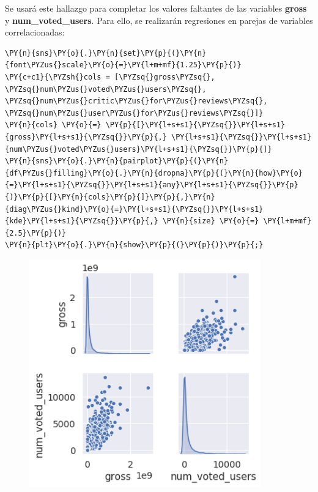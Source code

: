     Se usará este hallazgo para completar los valores faltantes de las
variables \textbf{gross} y \textbf{num\_voted\_users}. Para ello, se
realizarán regresiones en parejas de variables correlacionadas:

    \begin{tcolorbox}[breakable, size=fbox, boxrule=1pt, pad at break*=1mm,colback=cellbackground, colframe=cellborder]
\begin{Verbatim}[commandchars=\\\{\}]
\PY{n}{sns}\PY{o}{.}\PY{n}{set}\PY{p}{(}\PY{n}{font\PYZus{}scale}\PY{o}{=}\PY{l+m+mf}{1.25}\PY{p}{)}
\PY{c+c1}{\PYZsh{}cols = [\PYZsq{}gross\PYZsq{}, \PYZsq{}num\PYZus{}voted\PYZus{}users\PYZsq{}, \PYZsq{}num\PYZus{}critic\PYZus{}for\PYZus{}reviews\PYZsq{}, \PYZsq{}num\PYZus{}user\PYZus{}for\PYZus{}reviews\PYZsq{}]}
\PY{n}{cols} \PY{o}{=} \PY{p}{[}\PY{l+s+s1}{\PYZsq{}}\PY{l+s+s1}{gross}\PY{l+s+s1}{\PYZsq{}}\PY{p}{,} \PY{l+s+s1}{\PYZsq{}}\PY{l+s+s1}{num\PYZus{}voted\PYZus{}users}\PY{l+s+s1}{\PYZsq{}}\PY{p}{]}
\PY{n}{sns}\PY{o}{.}\PY{n}{pairplot}\PY{p}{(}\PY{n}{df\PYZus{}filling}\PY{o}{.}\PY{n}{dropna}\PY{p}{(}\PY{n}{how}\PY{o}{=}\PY{l+s+s1}{\PYZsq{}}\PY{l+s+s1}{any}\PY{l+s+s1}{\PYZsq{}}\PY{p}{)}\PY{p}{[}\PY{n}{cols}\PY{p}{]}\PY{p}{,}\PY{n}{diag\PYZus{}kind}\PY{o}{=}\PY{l+s+s1}{\PYZsq{}}\PY{l+s+s1}{kde}\PY{l+s+s1}{\PYZsq{}}\PY{p}{,} \PY{n}{size} \PY{o}{=} \PY{l+m+mf}{2.5}\PY{p}{)}
\PY{n}{plt}\PY{o}{.}\PY{n}{show}\PY{p}{(}\PY{p}{)}\PY{p}{;}
\end{Verbatim}
\end{tcolorbox}

\begin{figure}[h]
    \centering
    \captionsetup{width=10cm}
    \includegraphics[width=10cm]{./contenido/imagenes/output_82_0.png}

\end{figure}
    { \hspace*{\fill} \\}
    
